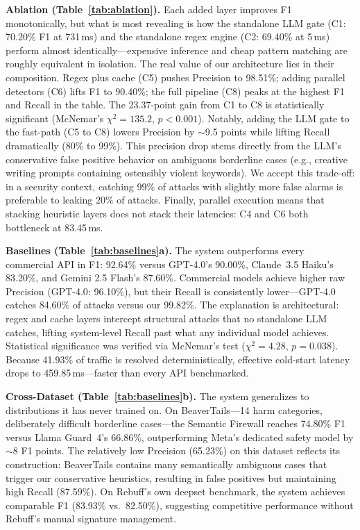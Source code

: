 \documentclass[conference]{IEEEtran}
\begin{document}
\textbf{Ablation (Table~\ref{tab:ablation}).}
Each added layer improves F1 monotonically, but what is most
revealing is how the standalone LLM gate (C1: 70.20\% F1 at
731\,ms) and the standalone regex engine (C2: 69.40\% at 5\,ms)
perform almost identically---expensive inference and cheap pattern
matching are roughly equivalent in isolation. The real value of our
architecture lies in their composition. Regex plus cache (C5) pushes
Precision to 98.51\%; adding parallel detectors (C6) lifts F1 to
90.40\%; the full pipeline (C8) peaks at the highest F1 and Recall
in the table. The 23.37-point gain from C1 to C8 is statistically
significant (McNemar's $\chi^2{=}135.2$, $p < 0.001$). Notably, adding the LLM gate to the fast-path (C5 to C8)
lowers Precision by $\sim$9.5 points while lifting Recall dramatically (80\% to 99\%).
This precision drop stems directly from the LLM's conservative false positive behavior
on ambiguous borderline cases (e.g., creative writing prompts containing ostensibly violent keywords).
We accept this trade-off: in a security context, catching 99\% of attacks with slightly
more false alarms is preferable to leaking 20\% of attacks. Finally, parallel execution
means that stacking heuristic layers does not stack their latencies: C4 and C6 both
bottleneck at 83.45\,ms.

\textbf{Baselines (Table~\ref{tab:baselines}a).}
The system outperforms every commercial API in F1: 92.64\% versus
GPT-4.0's 90.00\%, Claude~3.5 Haiku's 83.20\%, and Gemini 2.5 Flash's
87.60\%. Commercial models achieve higher raw Precision (GPT-4.0:
96.10\%), but their Recall is consistently lower---GPT-4.0 catches
84.60\% of attacks versus our 99.82\%. The explanation is
architectural: regex and cache layers intercept structural attacks
that no standalone LLM catches, lifting system-level Recall past
what any individual model achieves. Statistical significance was
verified via McNemar's test ($\chi^2{=}4.28$, $p = 0.038$). Because
41.93\% of traffic is resolved deterministically, effective
cold-start latency drops to 459.85\,ms---faster than every API
benchmarked.

\textbf{Cross-Dataset (Table~\ref{tab:baselines}b).}
The system generalizes to distributions it has never trained on. On
BeaverTails---14 harm categories, deliberately difficult borderline
cases---the Semantic Firewall reaches 74.80\% F1 versus Llama
Guard~4's 66.86\%, outperforming Meta's dedicated safety model by
$\sim$8 F1 points. The relatively low Precision (65.23\%) on this dataset reflects
its construction: BeaverTails contains many semantically ambiguous cases that
trigger our conservative heuristics, resulting in false positives but
maintaining high Recall (87.59\%). On Rebuff's own deepset benchmark, the system
achieves comparable F1 (83.93\% vs.\ 82.50\%), suggesting
competitive performance without Rebuff's manual signature management.
\end{document}
